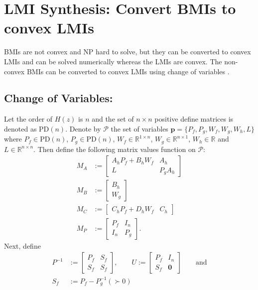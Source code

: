 \documentclass[a4paper]{article}
\begin{document}
\section{LMI Synthesis: Convert BMIs to convex LMIs}
BMIs are not convex and NP hard to solve, but they can be converted to convex LMIs  and can be solved numerically whereas the LMIs are convex. The non-convex BMIs can be converted to convex LMIs using change of variables \cite{Izumi1998}. 
\subsection*{Change of Variables:}
Let the order of $H(z)$ is $n$ and the set of $n \times n$ positive define matrices is denoted as $\textrm{PD}(n)$. Denote by $\mathcal{P}$ the set of variables $\mathbf{p} = \{P_{f}, P_{g}, W_{f}, W_{g}, W_{h}, L\}$ where $P_{f} \in \textrm{PD}(n)$,  $P_{g} \in \textrm{PD}(n)$, $W_{f} \in \mathbb{R}^{1 \times n}$,  $W_{g} \in \mathbb{R}^{n \times 1}$, $W_{h} \in \mathbb{R}$ and $L \in \mathbb{R}^{n \times n}$. Then define the following matrix values function on $\mathcal{P}$:
\begin{equation}
	\begin{aligned}
		M_{A}&:= \begin{bmatrix}
			A_{h} P_{f} + B_{h} W_{f} & A_{h} \\
			L & P_{g} A_{h}
		\end{bmatrix} \\
		M_{B} &:= \begin{bmatrix}
			B_{h} \\ W_{g}
		\end{bmatrix} \\
		M_{C} &:= \begin{bmatrix}
			C_{h}P_{f} + D_{h}W_{f} & C_{h}
		\end{bmatrix} \\
		M_{P} &:= \begin{bmatrix}
			P_{f} & I_{n} \\
			I_{n} & P_{g}
		\end{bmatrix}.
	\end{aligned}	
\end{equation}
Next, define 
\begin{align}
	{P}^{-1} &:= \begin{bmatrix}
		P_{f} & S_{f} \\
		S_{f} & S_{f}
	\end{bmatrix} ,
	\qquad
	U := \begin{bmatrix}
		P_f & I_{n} \\
		S_{f} & \mathbf{0}
	\end{bmatrix} \qquad \textrm{and} \\
	S_{f} &:= P_{f} - P_{g}^{-1} ( \succ 0)
\end{align}
\end{document}
